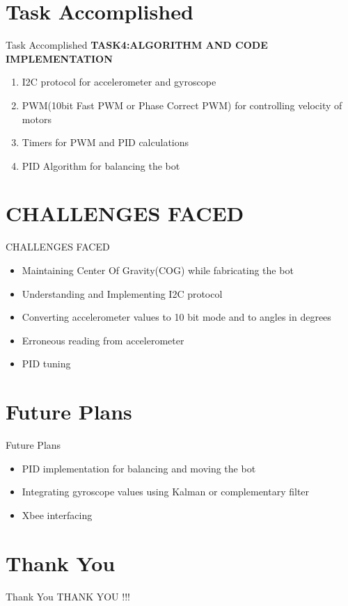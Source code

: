 \documentclass[10pt, a4paper]{beamer}
\begin{document}
\section{Task Accomplished}
\begin{frame}{Task Accomplished}
	\textbf{TASK4:ALGORITHM AND CODE IMPLEMENTATION}
	\begin{enumerate}
		\item I2C protocol for accelerometer and gyroscope
		\item PWM(10bit Fast PWM or Phase Correct PWM) for controlling velocity of motors 
		\item Timers for PWM and PID calculations
		\item PID Algorithm for balancing the bot 
	\end{enumerate}
\end{frame}


\section{CHALLENGES FACED}
\begin{frame}{CHALLENGES FACED}
	\begin{itemize}
	 \item Maintaining Center Of Gravity(COG) while fabricating the bot
	 \item Understanding and Implementing I2C protocol
	 \item Converting accelerometer values to 10 bit mode and to angles in degrees
	 \item Erroneous reading from accelerometer
	 \item PID tuning  
	 \end{itemize}
\end{frame}

\section{Future Plans}
\begin{frame}{Future Plans}
	\begin{itemize}
		\item PID implementation for balancing and moving the bot
		\item Integrating gyroscope values using Kalman or complementary filter
		\item Xbee interfacing 
	\end{itemize}
\end{frame}


\section{Thank You}
\begin{frame}{Thank You}
	\centering THANK YOU !!!
\end{frame}
\end{document}
